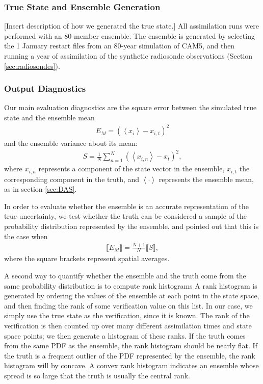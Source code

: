 \subsubsection{True State and Ensemble Generation}

\textcolor{alert}{[Insert description of how we generated the true state.]}
All assimilation runs were performed with an 80-member ensemble.
The ensemble is generated by selecting the 1 January restart files from an 80-year simulation of CAM5, and then running a year of assimilation of the synthetic radiosonde observations (Section \ref{sec:radiosondes}).


\subsubsection{Output Diagnostics}
Our main evaluation diagnostics are the square error between the simulated true state and the ensemble mean
\begin{eqnarray}
E_M = \left(
\left< x_i \right>-x_{i,t}
\right)^2
\end{eqnarray}
and the ensemble variance about its mean:
\begin{eqnarray}
S = 
\frac{1}{N}
\sum_{n=1}^N
\left(
\left< x_{i,n} \right>-x_t
\right)^2,
\end{eqnarray}
where $x_{i,n}$ represents a component of the state vector in the ensemble,  $x_{i,t}$ the corresponding component in the truth, and $\left< \cdot \right>$ represents the ensemble mean, as in section \ref{sec:DAS}.

In order to evaluate whether the ensemble is an accurate representation of the true uncertainty, we  test whether the truth can be considered a sample of the probability distribution represented by the ensemble.
 \citet{Huntley2009} and \citet{Murphy1988} pointed out that this is the case when 
\begin{eqnarray}
\llbracket E_M \rrbracket = \frac{N+1}{N} \llbracket S \rrbracket, 
\label{eq:EvsS}
\end{eqnarray}
where the square brackets represent spatial averages. 

A second way to quantify whether the ensemble and the truth come from the same probability distribution is to compute rank histograms \citep[and references therein]{Hamill2001}
A rank histogram is generated by ordering the values of the ensemble at each point in the state space, and then finding the rank of some verification value on this list.
In our case, we simply use the true state as the verification, since it is known.
The rank of the verification is then counted up over many different assimilation times and state space points; we then generate a histogram of these ranks.
If the truth comes from the same PDF as the ensemble, the rank histogram should be nearly flat.  
If the truth is a frequent outlier of the PDF represented by the ensemble, the rank histogram will by concave.
A convex rank histogram indicates an ensemble whose spread is so large that the truth is usually the central rank. 

